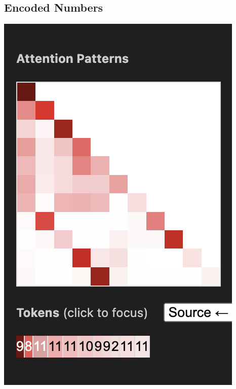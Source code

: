 \documentclass{article}
\begin{document}
\subsection{Encoded Numbers}
\begin{center}
    \includegraphics[scale=0.4]{images/att_encoding1.png}

\end{center}
\end{document}
